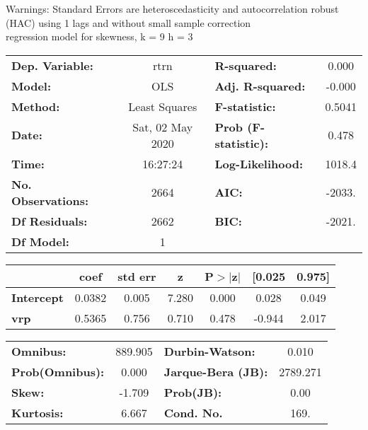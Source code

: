 Warnings: \newline
 [1] Standard Errors are heteroscedasticity and autocorrelation robust (HAC) using 1 lags and without small sample correction\\ 

regression model for skewness, k = 9 h = 3\begin{center}
\begin{tabular}{lclc}
\toprule
\textbf{Dep. Variable:}    &       rtrn       & \textbf{  R-squared:         } &     0.000   \\
\textbf{Model:}            &       OLS        & \textbf{  Adj. R-squared:    } &    -0.000   \\
\textbf{Method:}           &  Least Squares   & \textbf{  F-statistic:       } &    0.5041   \\
\textbf{Date:}             & Sat, 02 May 2020 & \textbf{  Prob (F-statistic):} &    0.478    \\
\textbf{Time:}             &     16:27:24     & \textbf{  Log-Likelihood:    } &    1018.4   \\
\textbf{No. Observations:} &        2664      & \textbf{  AIC:               } &    -2033.   \\
\textbf{Df Residuals:}     &        2662      & \textbf{  BIC:               } &    -2021.   \\
\textbf{Df Model:}         &           1      & \textbf{                     } &             \\
\bottomrule
\end{tabular}
\begin{tabular}{lcccccc}
                   & \textbf{coef} & \textbf{std err} & \textbf{z} & \textbf{P$> |$z$|$} & \textbf{[0.025} & \textbf{0.975]}  \\
\midrule
\textbf{Intercept} &       0.0382  &        0.005     &     7.280  &         0.000        &        0.028    &        0.049     \\
\textbf{vrp}       &       0.5365  &        0.756     &     0.710  &         0.478        &       -0.944    &        2.017     \\
\bottomrule
\end{tabular}
\begin{tabular}{lclc}
\textbf{Omnibus:}       & 889.905 & \textbf{  Durbin-Watson:     } &    0.010  \\
\textbf{Prob(Omnibus):} &   0.000 & \textbf{  Jarque-Bera (JB):  } & 2789.271  \\
\textbf{Skew:}          &  -1.709 & \textbf{  Prob(JB):          } &     0.00  \\
\textbf{Kurtosis:}      &   6.667 & \textbf{  Cond. No.          } &     169.  \\
\bottomrule
\end{tabular}
\end{center}

